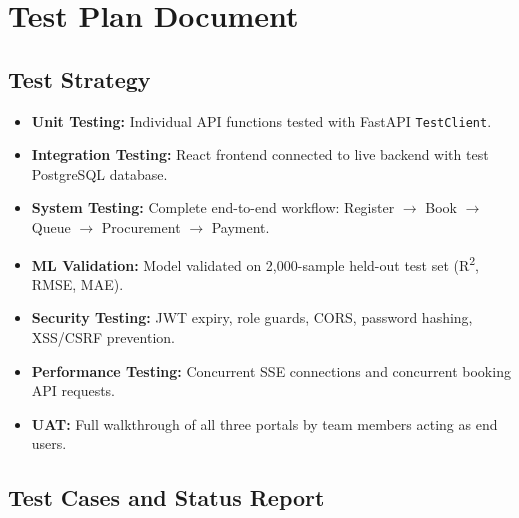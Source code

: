 \chapter{Test Plan Document}

\section{Test Strategy}
\begin{itemize}
  \item \textbf{Unit Testing:} Individual API functions tested with FastAPI \texttt{TestClient}.
  \item \textbf{Integration Testing:} React frontend connected to live backend with test PostgreSQL database.
  \item \textbf{System Testing:} Complete end-to-end workflow: Register $\to$ Book $\to$ Queue $\to$ Procurement $\to$ Payment.
  \item \textbf{ML Validation:} Model validated on 2,000-sample held-out test set (R\textsuperscript{2}, RMSE, MAE).
  \item \textbf{Security Testing:} JWT expiry, role guards, CORS, password hashing, XSS/CSRF prevention.
  \item \textbf{Performance Testing:} Concurrent SSE connections and concurrent booking API requests.
  \item \textbf{UAT:} Full walkthrough of all three portals by team members acting as end users.
\end{itemize}

\section{Test Cases and Status Report}


